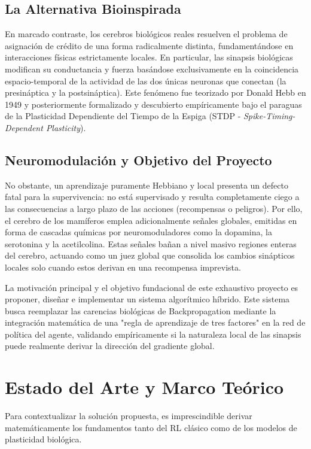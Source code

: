 \documentclass[a4paper,12pt,twocolumn]{article}
\begin{document}
\subsection{La Alternativa Bioinspirada}
En marcado contraste, los cerebros biológicos reales resuelven el problema de asignación de crédito de una forma radicalmente distinta, fundamentándose en interacciones físicas estrictamente locales. En particular, las sinapsis biológicas modifican su conductancia y fuerza basándose exclusivamente en la coincidencia espacio-temporal de la actividad de las dos únicas neuronas que conectan (la presináptica y la postsináptica). Este fenómeno fue teorizado por Donald Hebb en 1949 y posteriormente formalizado y descubierto empíricamente bajo el paraguas de la Plasticidad Dependiente del Tiempo de la Espiga (STDP - \textit{Spike-Timing-Dependent Plasticity}). 

\subsection{Neuromodulación y Objetivo del Proyecto}
No obstante, un aprendizaje puramente Hebbiano y local presenta un defecto fatal para la supervivencia: no está supervisado y resulta completamente ciego a las consecuencias a largo plazo de las acciones (recompensas o peligros). Por ello, el cerebro de los mamíferos emplea adicionalmente señales globales, emitidas en forma de cascadas químicas por neuromoduladores como la dopamina, la serotonina y la acetilcolina. Estas señales bañan a nivel masivo regiones enteras del cerebro, actuando como un juez global que consolida los cambios sinápticos locales solo cuando estos derivan en una recompensa imprevista.

La motivación principal y el objetivo fundacional de este exhaustivo proyecto es proponer, diseñar e implementar un sistema algorítmico híbrido. Este sistema busca reemplazar las carencias biológicas de Backpropagation mediante la integración matemática de una "regla de aprendizaje de tres factores" en la red de política del agente, validando empíricamente si la naturaleza local de las sinapsis puede realmente derivar la dirección del gradiente global.

\section{Estado del Arte y Marco Teórico}
Para contextualizar la solución propuesta, es imprescindible derivar matemáticamente los fundamentos tanto del RL clásico como de los modelos de plasticidad biológica.
\end{document}
